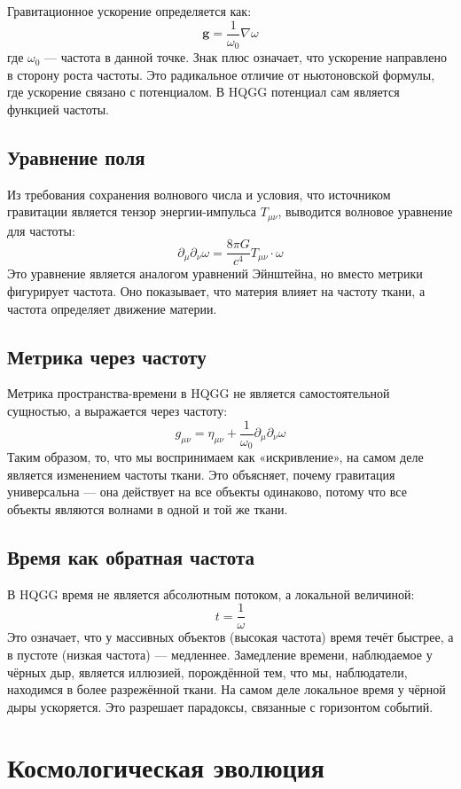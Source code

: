 \documentclass[12pt,a4paper]{article}
\begin{document}
Гравитационное ускорение определяется как:
\[
\mathbf{g} = \frac{1}{\omega_0} \nabla \omega
\]
где \(\omega_0\) — частота в данной точке. Знак плюс означает, что ускорение направлено в сторону роста частоты. Это радикальное отличие от ньютоновской формулы, где ускорение связано с потенциалом. В HQGG потенциал сам является функцией частоты.

\subsection{Уравнение поля}

Из требования сохранения волнового числа и условия, что источником гравитации является тензор энергии-импульса \(T_{\mu\nu}\), выводится волновое уравнение для частоты:
\[
\partial_\mu \partial_\nu \omega = \frac{8\pi G}{c^4} T_{\mu\nu} \cdot \omega
\]
Это уравнение является аналогом уравнений Эйнштейна, но вместо метрики фигурирует частота. Оно показывает, что материя влияет на частоту ткани, а частота определяет движение материи.

\subsection{Метрика через частоту}

Метрика пространства-времени в HQGG не является самостоятельной сущностью, а выражается через частоту:
\[
g_{\mu\nu} = \eta_{\mu\nu} + \frac{1}{\omega_0} \partial_\mu \partial_\nu \omega
\]
Таким образом, то, что мы воспринимаем как «искривление», на самом деле является изменением частоты ткани. Это объясняет, почему гравитация универсальна — она действует на все объекты одинаково, потому что все объекты являются волнами в одной и той же ткани.

\subsection{Время как обратная частота}

В HQGG время не является абсолютным потоком, а локальной величиной:
\[
t = \frac{1}{\omega}
\]
Это означает, что у массивных объектов (высокая частота) время течёт быстрее, а в пустоте (низкая частота) — медленнее. Замедление времени, наблюдаемое у чёрных дыр, является иллюзией, порождённой тем, что мы, наблюдатели, находимся в более разрежённой ткани. На самом деле локальное время у чёрной дыры ускоряется. Это разрешает парадоксы, связанные с горизонтом событий.

\section{Космологическая эволюция}
\end{document}
